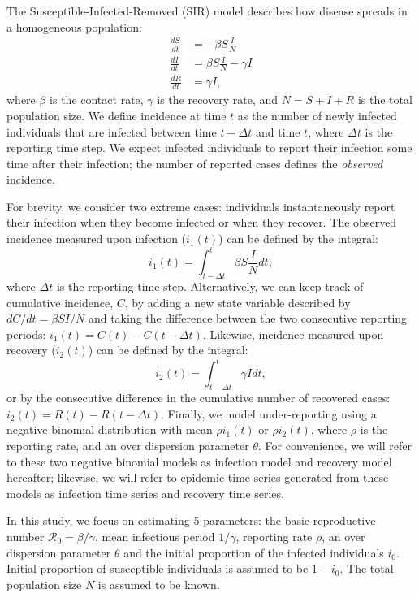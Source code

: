 \documentclass{article}\usepackage[]{graphicx}\usepackage[]{color}
\begin{document}
The Susceptible-Infected-Removed (SIR) model describes how disease spreads in a
homogeneous population:
\begin{equation}
\begin{aligned}
\frac{dS}{dt} &= - \beta S \frac{I}{N}\\
\frac{dI}{dt} &= \beta S \frac{I}{N} - \gamma I\\
\frac{dR}{dt} &= \gamma I,
\end{aligned}
\end{equation}
where $\beta$ is the contact rate, $\gamma$ is the recovery rate, and $N = S + I + R$ is
the total population size. We define incidence at time $t$ as the number of newly infected
individuals that are infected between time $t- \Delta t$ and time $t$, where $\Delta t$ is
the reporting time step. We expect infected individuals to report their infection some time
after their infection; the number of reported cases defines the \emph{observed} incidence. 

For brevity, we consider two extreme cases: individuals instantaneously report
their infection when they become infected or when they recover. The observed incidence 
measured upon infection ($i_1(t)$) can be defined by the integral:
\begin{equation}
i_1(t) = \int_{t - \Delta t}^{t} \beta S \frac{I}{N} dt,
\end{equation}
where $\Delta t$ is the reporting time step.
Alternatively, we can keep track of cumulative incidence, $C$, by adding a 
new state variable described by $dC/dt = \beta S I/N$ and taking the difference between 
the two consecutive reporting periods: $i_1(t) = C(t) - C(t-\Delta t)$. Likewise, 
incidence measured upon recovery ($i_2(t)$) can be defined by the integral:
\begin{equation}
i_2(t) = \int_{t-\Delta t}^{t} \gamma I dt,
\end{equation}
or by the consecutive difference in the cumulative number of recovered cases:
$i_2(t) = R(t) - R(t - \Delta t)$.
Finally, we model under-reporting using a negative binomial distribution with
mean $\rho i_1(t)$ or $\rho i_2(t)$, where $\rho$ is the reporting rate, and
an over dispersion parameter $\theta$. For convenience, we will refer to these two
negative binomial models as infection model and recovery model hereafter; 
likewise, we will refer to epidemic time series generated from these models 
as infection time series and recovery time series.

In this study, we focus on estimating 5 parameters: the basic reproductive
number $\mathcal R_0 = \beta/\gamma$, mean infectious period $1/\gamma$, 
reporting rate $\rho$, an over dispersion parameter $\theta$ and the initial
proportion of the infected individuals $i_0$. Initial proportion of
susceptible individuals is assumed to be $1 - i_0$. The total population
size $N$ is assumed to be known.
\end{document}
